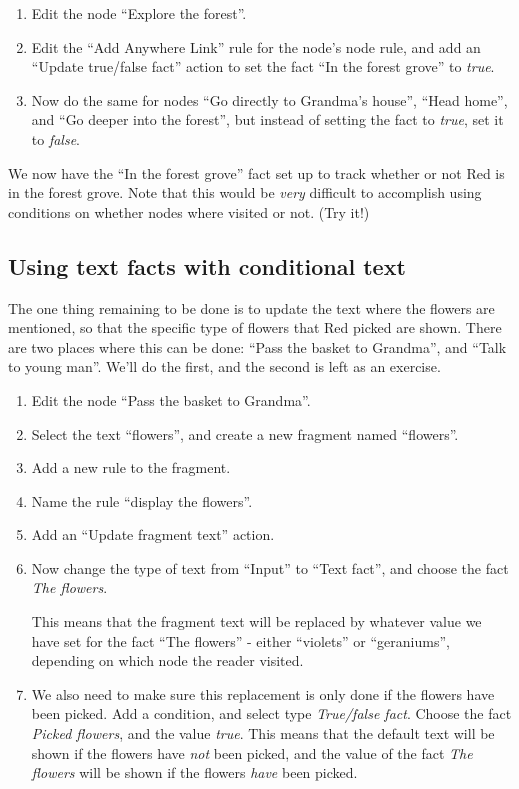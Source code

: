 \documentclass{article}
\begin{document}
\begin{enumerate}
  \item Edit the node ``Explore the forest''.
  \item Edit the ``Add Anywhere Link'' rule for the node's node rule, and add an ``Update true/false fact'' action to set the fact ``In the forest grove'' to \textit{true}.
  \item Now do the same for nodes ``Go directly to Grandma's house'', ``Head home'', and ``Go deeper into the forest'', but instead of setting the fact to \textit{true}, set it to \textit{false}.
\end{enumerate}

We now have the ``In the forest grove'' fact set up to track whether or not Red is in the forest grove. Note that this would be \textit{very} difficult to accomplish using conditions on whether nodes where visited or not. (Try it!)

\subsection{Using text facts with conditional text}

The one thing remaining to be done is to update the text where the flowers are mentioned, so that the specific type of flowers that Red picked are shown. There are two places where this can be done: ``Pass the basket to Grandma'', and ``Talk to young man''. We'll do the first, and the second is left as an exercise.

\begin{enumerate}
  \item Edit the node ``Pass the basket to Grandma''.
  \item Select the text ``flowers'', and create a new fragment named ``flowers''.
  \item Add a new rule to the fragment.
  \item Name the rule ``display the flowers''.
  \item Add an ``Update fragment text'' action.
  \item Now change the type of text from ``Input'' to ``Text fact'', and choose the fact \textit{The flowers}.

This means that the fragment text will be replaced by whatever value we have set for the fact ``The flowers'' - either ``violets'' or ``geraniums'', depending on which node the reader visited. 

\item We also need to make sure this replacement is only done if the flowers have been picked. Add a condition, and select type \textit{True/false fact}. Choose the fact \textit{Picked flowers}, and the value \textit{true}. This means that the default text will be shown if the flowers have \textit{not} been picked, and the value of the fact \textit{The flowers} will be shown if the flowers \textit{have} been picked.
\end{enumerate}
\end{document}
